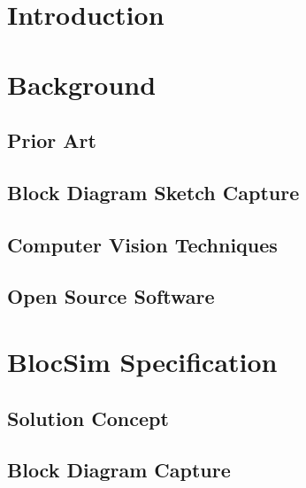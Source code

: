 \mainmatter


\chapter{Introduction}




\chapter{Background}



\section{Prior Art}



\section{Block Diagram Sketch Capture}



\section{Computer Vision Techniques}



\section{Open Source Software}




\chapter{BlocSim Specification}



\section{Solution Concept}



\section{Block Diagram Capture}



